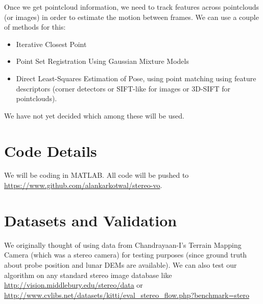 \documentclass[11pt]{report}
\begin{document}
\noindent Once we get pointcloud information, we need to track features across pointclouds (or images) in order to estimate the motion between frames. We can use a couple of methods for this:
\begin{itemize}
\item Iterative Closest Point
\item Point Set Registration Using Gaussian Mixture Models
\item Direct Least-Squares Estimation of Pose, using point matching using feature descriptors (corner detectors or SIFT-like for images or 3D-SIFT for pointclouds).
\end{itemize}

\noindent We have not yet decided which among these will be used.

\section*{Code Details}
We will be coding in MATLAB. All code will be pushed to \url{https://www.github.com/alankarkotwal/stereo-vo}.

\section*{Datasets and Validation}
We originally thought of using data from Chandrayaan-I's Terrain Mapping Camera (which was a stereo camera) for testing purposes (since ground truth about probe position and lunar DEMs are available). We can also test our algorithm on any standard stereo image database like \url{http://vision.middlebury.edu/stereo/data} or \url{http://www.cvlibs.net/datasets/kitti/eval_stereo_flow.php?benchmark=stero}
\end{document}
